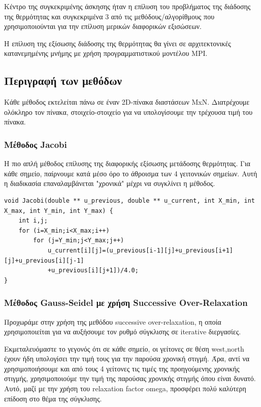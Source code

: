 \documentclass[../final_report.tex]{subfiles}
\begin{document}
Κέντρο της συγκεκριμένης άσκησης ήταν η επίλυση του προβλήματος της διάδοσης της θερμότητας
και συγκεκριμένα 3 από τις μεθόδους/αλγορίθμους που χρησιμοποιούνται για την επίλυση μερικών
διαφορικών εξισώσεων.

Η επίλυση της εξίσωσης διάδοσης της θερμότητας θα γίνει σε αρχιτεκτονικές κατανεμημένης μνήμης
με χρήση προγραμματιστικού μοντέλου MPI.

\subsection{Περιγραφή των μεθόδων}

Κάθε μέθοδος εκτελείται πάνω σε έναν 2D-πίνακα διαστάσεων MxN. Διατρέχουμε ολόκληρο τον πίνακα, στοιχείο-στοιχείο για να υπολογίσουμε την τρέχουσα
τιμή του πίνακα. 

\subsubsection{Μέθοδος Jacobi}
Η πιο απλή μέθοδος επίλυσης της διαφορικής εξίσωσης μετάδοσης θερμότητας. Για κάθε σημείο, παίρνουμε κατά μέσο όρο το άθροισμα των 4 γειτονικών σημείων. 
Αυτή η διαδικασία επαναλαμβάνεται "χρονικά" μέχρι να συγκλίνει η μέθοδος.

\begin{lstlisting}
void Jacobi(double ** u_previous, double ** u_current, int X_min, int X_max, int Y_min, int Y_max) {
	int i,j;
	for (i=X_min;i<X_max;i++)
		for (j=Y_min;j<Y_max;j++)
			u_current[i][j]=(u_previous[i-1][j]+u_previous[i+1][j]+u_previous[i][j-1]
            +u_previous[i][j+1])/4.0;
}
\end{lstlisting}

\subsubsection{Μέθοδος Gauss-Seidel με χρήση Successive Over-Relaxation}
Προχωράμε στην χρήση της μεθόδου successive over-relaxation, η οποία χρησιμοποιείται για να αυξήσουμε τον ρυθμό σύγκλισης σε iterative διεργασίες. 

Εκμεταλευόμαστε το γεγονός ότι σε κάθε σημείο, οι γείτονες σε θέση west,north έχουν ήδη υπολογίσει την τιμή τους για την παρούσα χρονική στιγμή. Άρα, αντί
να χρησιμοποιήσουμε και από τους 4 γείτονες τις τιμές της προηγούμενης χρονικής στιγμής, χρησιμοποιούμε την τιμή της παρούσας χρονικής στιγμής όπου είναι δυνατό.
Αυτό, μαζί με την χρήση του relaxation factor omega, προσφέρει πολύ καλύτερη επίδοση στο θέμα της σύγκλισης. 
\end{document}

